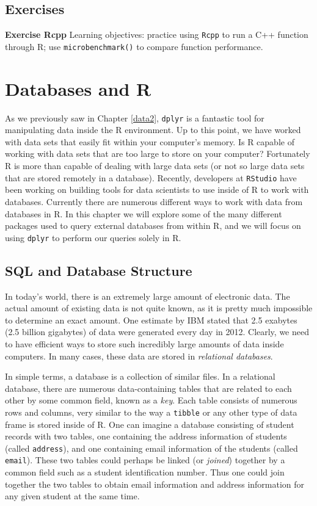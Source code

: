 \documentclass[]{krantz}
\begin{document}
\section{Exercises}\label{exercises-9}

\textbf{Exercise Rcpp} Learning objectives: practice using \texttt{Rcpp}
to run a C++ function through R; use \texttt{microbenchmark()} to
compare function performance.

\chapter{Databases and R}\label{databases-and-r}

As we previously saw in Chapter \ref{data2}, \texttt{dplyr} is a
fantastic tool for manipulating data inside the R environment. Up to
this point, we have worked with data sets that easily fit within your
computer's memory. Is R capable of working with data sets that are too
large to store on your computer? Fortunately R is more than capable of
dealing with large data sets (or not so large data sets that are stored
remotely in a database). Recently, developers at \texttt{RStudio} have
been working on building tools for data scientists to use inside of R to
work with databases. Currently there are numerous different ways to work
with data from databases in R. In this chapter we will explore some of
the many different packages used to query external databases from within
R, and we will focus on using \texttt{dplyr} to perform our queries
solely in R.

\section{SQL and Database Structure}\label{sql-and-database-structure}

In today's world, there is an extremely large amount of electronic data.
The actual amount of existing data is not quite known, as it is pretty
much impossible to determine an exact amount. One estimate by IBM stated
that 2.5 exabytes (2.5 billion gigabytes) of data were generated every
day in 2012. Clearly, we need to have efficient ways to store such
incredibly large amounts of data inside computers. In many cases, these
data are stored in \emph{relational databases}.

In simple terms, a database is a collection of similar files. In a
relational database, there are numerous data-containing tables that are
related to each other by some common field, known as a \emph{key}. Each
table consists of numerous rows and columns, very similar to the way a
\texttt{tibble} or any other type of data frame is stored inside of R.
One can imagine a database consisting of student records with two
tables, one containing the address information of students (called
\texttt{address}), and one containing email information of the students
(called \texttt{email}). These two tables could perhaps be linked (or
\emph{joined}) together by a common field such as a student
identification number. Thus one could join together the two tables to
obtain email information and address information for any given student
at the same time.
\end{document}
